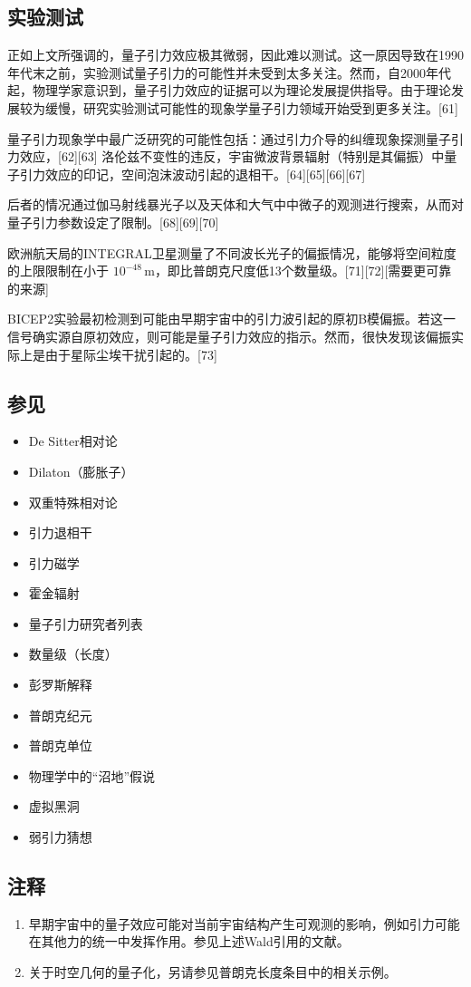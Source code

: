 \subsection{实验测试}
正如上文所强调的，量子引力效应极其微弱，因此难以测试。这一原因导致在1990年代末之前，实验测试量子引力的可能性并未受到太多关注。然而，自2000年代起，物理学家意识到，量子引力效应的证据可以为理论发展提供指导。由于理论发展较为缓慢，研究实验测试可能性的现象学量子引力领域开始受到更多关注。[61]  

量子引力现象学中最广泛研究的可能性包括：通过引力介导的纠缠现象探测量子引力效应，[62][63]  洛伦兹不变性的违反，宇宙微波背景辐射（特别是其偏振）中量子引力效应的印记，空间泡沫波动引起的退相干。[64][65][66][67]  

后者的情况通过伽马射线暴光子以及天体和大气中中微子的观测进行搜索，从而对量子引力参数设定了限制。[68][69][70]  

欧洲航天局的INTEGRAL卫星测量了不同波长光子的偏振情况，能够将空间粒度的上限限制在小于 \(10^{-48} \, \text{m}\)，即比普朗克尺度低13个数量级。[71][72][需要更可靠的来源]  

BICEP2实验最初检测到可能由早期宇宙中的引力波引起的原初B模偏振。若这一信号确实源自原初效应，则可能是量子引力效应的指示。然而，很快发现该偏振实际上是由于星际尘埃干扰引起的。[73]  
\subsection{参见}
\begin{itemize}
\item De Sitter相对论 
\item Dilaton（膨胀子）  
\item 双重特殊相对论  
\item 引力退相干  
\item 引力磁学  
\item 霍金辐射  
\item 量子引力研究者列表  
\item 数量级（长度）  
\item 彭罗斯解释  
\item 普朗克纪元  
\item 普朗克单位  
\item 物理学中的“沼地”假说  
\item 虚拟黑洞  
\item 弱引力猜想
\end{itemize}
\subsection{注释}  
\begin{enumerate}
\item 早期宇宙中的量子效应可能对当前宇宙结构产生可观测的影响，例如引力可能在其他力的统一中发挥作用。参见上述Wald引用的文献。  
\item 关于时空几何的量子化，另请参见普朗克长度条目中的相关示例。
\end{enumerate}
